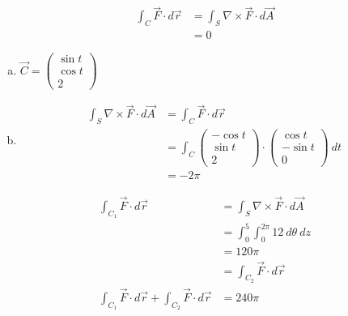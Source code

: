 \documentclass[8pt]{extarticle}
\begin{document}
\begin{description}[font=\normalfont]
\begin{align*}
        \int_{C}\vec{F} \cdot d\vec{r} &= \int_{S}\nabla\times\vec{F} \cdot d\vec{A}\\
                                       &= 0
      \end{align*}
    \item[28:]\hfill
      \begin{enumerate}[(a)]
        \item $\displaystyle\vec{C} = \begin{pmatrix}\sin t\\\cos t\\2\end{pmatrix}$
        \item
          \begin{align*}
            \int_{S}\nabla\times\vec{F}\cdot d\vec{A} &= \int_{C} \vec{F} \cdot d\vec{r}\\
                                                      &= \int_{C} \begin{pmatrix}-\cos t\\\sin t\\2\end{pmatrix}\cdot \begin{pmatrix}\cos t\\-\sin t\\0\end{pmatrix}~dt\\
                                                      &= -2\pi
          \end{align*}
      \end{enumerate}
    \item[34:] 
      \begin{align*}
        \int_{C_1}\vec{F} \cdot d\vec{r} &= \int_{S}\nabla\times\vec{F} \cdot d\vec{A}\\
                                        &= \int_{0}^{5}\int_{0}^{2\pi}12~d\theta~dz\\
                                        &= 120\pi\\
                                        &= \int_{C_2}\vec{F}\cdot d\vec{r}\\
        \int_{C_1}\vec{F}\cdot d\vec{r} + \int_{C_2}\vec{F}\cdot d\vec{r} &= 240\pi
      \end{align*}
  \end{description}
\end{document}
